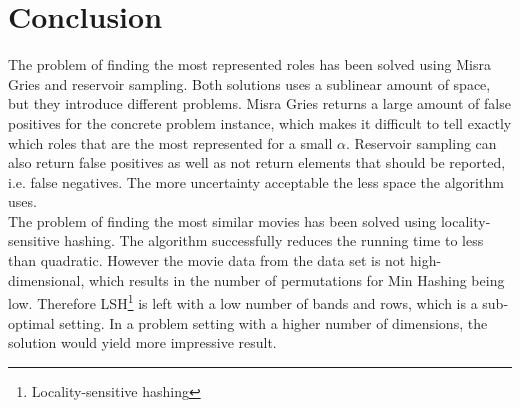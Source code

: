 
\section{Conclusion}
The problem of finding the most represented roles has been solved using Misra Gries and reservoir sampling. Both solutions uses a sublinear amount of space, but they introduce different problems. Misra Gries returns a large amount of false positives for the concrete problem instance, which makes it difficult to tell exactly which roles that are the most represented for a small \(\alpha\). Reservoir sampling can also return false positives as well as not return elements that should be reported, i.e. false negatives. The more uncertainty acceptable the less space the algorithm uses.\\

The problem of finding the most similar movies has been solved using locality-sensitive hashing. The algorithm successfully reduces the running time to less than quadratic. However the movie data from the data set is not high-dimensional, which results in the number of permutations for Min Hashing being low. Therefore LSH\footnote{Locality-sensitive hashing} is left with a low number of bands and rows, which is a sub-optimal setting. In a problem setting with a higher number of dimensions, the solution would yield more impressive result.
